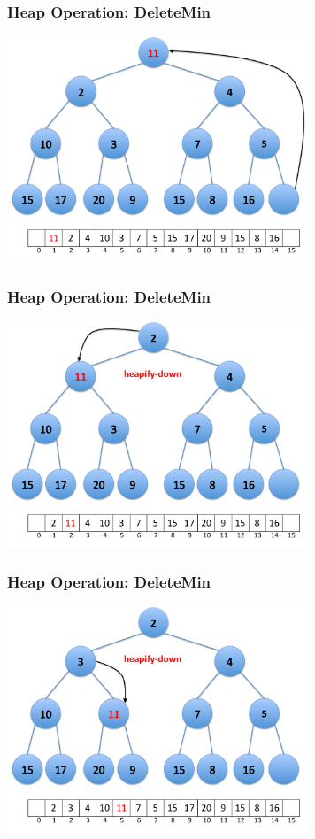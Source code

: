 \documentclass{beamer}
\begin{document}
\begin{frame}[containsverbatim]
\frametitle{Heap Operation: DeleteMin}

\begin{center}
\includegraphics[width=9cm]{heap_delete_min2.pdf}%
\end{center}

\end{frame}

\begin{frame}[containsverbatim]
\frametitle{Heap Operation: DeleteMin}

\begin{center}
\includegraphics[width=9cm]{heap_delete_min3.pdf}%
\end{center}

\end{frame}

\begin{frame}[containsverbatim]
\frametitle{Heap Operation: DeleteMin}

\begin{center}
\includegraphics[width=9cm]{heap_delete_min4.pdf}%
\end{center}

\end{frame}
\end{document}
